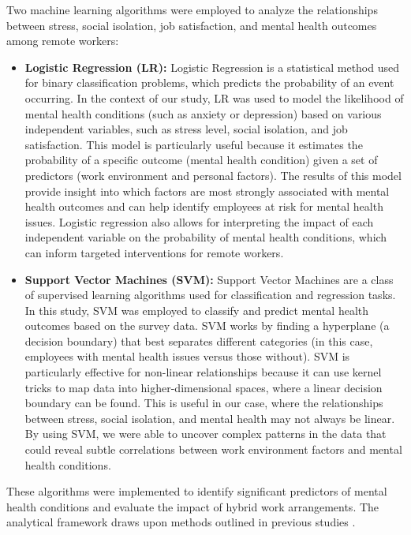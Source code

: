 \documentclass[conference]{IEEEtran}
\begin{document}
Two machine learning algorithms were employed to analyze the relationships between stress, social isolation, job satisfaction, and mental health outcomes among remote workers:

\begin{itemize}
    \item \textbf{Logistic Regression (LR):}  
    Logistic Regression is a statistical method used for binary classification problems, which predicts the probability of an event occurring. In the context of our study, LR was used to model the likelihood of mental health conditions (such as anxiety or depression) based on various independent variables, such as stress level, social isolation, and job satisfaction. This model is particularly useful because it estimates the probability of a specific outcome (mental health condition) given a set of predictors (work environment and personal factors). The results of this model provide insight into which factors are most strongly associated with mental health outcomes and can help identify employees at risk for mental health issues. Logistic regression also allows for interpreting the impact of each independent variable on the probability of mental health conditions, which can inform targeted interventions for remote workers.
    
    \item \textbf{Support Vector Machines (SVM):}  
    Support Vector Machines are a class of supervised learning algorithms used for classification and regression tasks. In this study, SVM was employed to classify and predict mental health outcomes based on the survey data. SVM works by finding a hyperplane (a decision boundary) that best separates different categories (in this case, employees with mental health issues versus those without). SVM is particularly effective for non-linear relationships because it can use kernel tricks to map data into higher-dimensional spaces, where a linear decision boundary can be found. This is useful in our case, where the relationships between stress, social isolation, and mental health may not always be linear. By using SVM, we were able to uncover complex patterns in the data that could reveal subtle correlations between work environment factors and mental health conditions.
\end{itemize}


These algorithms were implemented to identify significant predictors of mental health conditions and evaluate the impact of hybrid work arrangements. The analytical framework draws upon methods outlined in previous studies \cite{ref1, ref3}.
\end{document}
